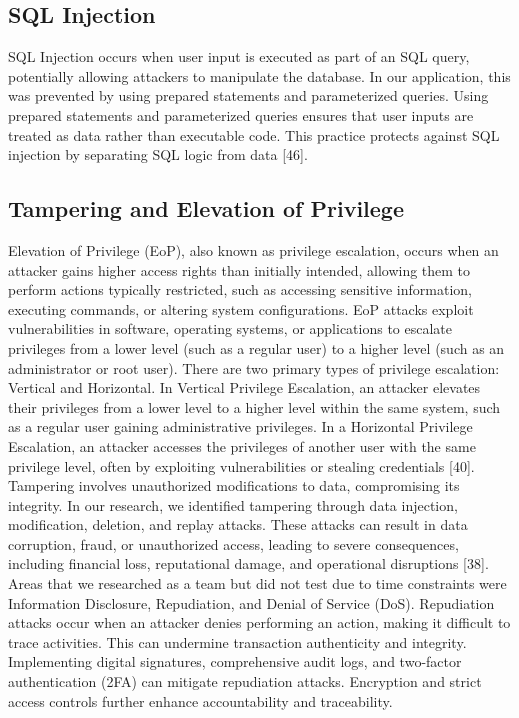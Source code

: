 \documentclass[letterpaper,twocolumn]{article}
\begin{document}
\subsection{SQL Injection}
SQL Injection occurs when user input is executed as part of an SQL query, potentially allowing attackers to manipulate the database. In our application, this was prevented by using prepared statements and parameterized queries. Using prepared statements and parameterized queries ensures that user inputs are treated as data rather than executable code. This practice protects against SQL injection by separating SQL logic from data [46].

\subsection{Tampering and Elevation of Privilege}
Elevation of Privilege (EoP), also known as privilege escalation, occurs when an attacker gains higher access rights than initially intended, allowing them to perform actions typically restricted, such as accessing sensitive information, executing commands, or altering system configurations. EoP attacks exploit vulnerabilities in software, operating systems, or applications to escalate privileges from a lower level (such as a regular user) to a higher level (such as an administrator or root user).
There are two primary types of privilege escalation: Vertical and Horizontal. In Vertical Privilege Escalation, an attacker elevates their privileges from a lower level to a higher level within the same system, such as a regular user gaining administrative privileges. In a Horizontal Privilege Escalation, an attacker accesses the privileges of another user with the same privilege level, often by exploiting vulnerabilities or stealing credentials [40].
Tampering involves unauthorized modifications to data, compromising its integrity. In our research, we identified tampering through data injection, modification, deletion, and replay attacks. These attacks can result in data corruption, fraud, or unauthorized access, leading to severe consequences, including financial loss, reputational damage, and operational disruptions [38].
Areas that we researched as a team but did not test due to time constraints were Information Disclosure, Repudiation, and Denial of Service (DoS).
Repudiation attacks occur when an attacker denies performing an action, making it difficult to trace activities. This can undermine transaction authenticity and integrity.  Implementing digital signatures, comprehensive audit logs, and two-factor authentication (2FA) can mitigate repudiation attacks. Encryption and strict access controls further enhance accountability and traceability.
\end{document}
